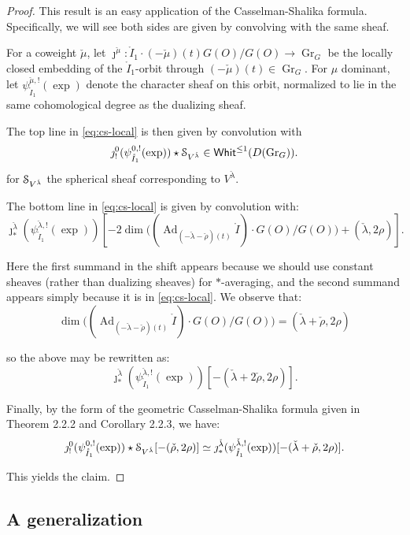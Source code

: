 \documentclass[reqno,11pt]{amsart}
\numberwithin{equation}{subsection}
\theoremstyle{remark}
\newcommand{\sS}{{\EuScript S}}
\newcommand{\on}{\operatorname}
\newcommand{\Ad}{\on{Ad}}
\newcommand{\Gr}{\on{Gr}}
\newcommand{\Whit}{\mathsf{Whit}}
\renewcommand{\o}[1]{\mathring{#1}}
\begin{document}
\begin{proof}

This result is an easy application of the Casselman-Shalika formula.
Specifically, we will see both sides are given by convolving with the
same sheaf. 

For a coweight $\check{\mu}$, 
let $\jmath^{\check{\mu}}: \o{I}_1\cdot (-\check{\mu})(t) G(O)/G(O) \to \Gr_G$
be the locally closed embedding of the $\o{I}_1$-orbit through 
$(-\check{\mu})(t) \in \Gr_G$.
For $\mu$ dominant, let $\psi_{\o{I}_1}^{\check{\mu},!}(\exp)$ denote the 
character sheaf on this orbit, normalized to lie in the same cohomological
degree as the dualizing sheaf. 

The top line in \eqref{eq:cs-local} is then given by convolution with 
%
\[
\jmath_!^0(\psi_{\o{I}_1}^{0,!}(\exp))  \star \sS_{V^{\check{\lambda}}} \in 
\Whit^{\leq 1}(D(\Gr_G)).
\]
\noindent for $\sS_{V^{\check{\lambda}}}$ the spherical sheaf corresponding
to $V^{\check{\lambda}}$.

The bottom line in \eqref{eq:cs-local} is given by convolution 
with: 
%
\[
\jmath_*^{\check{\lambda}}(\psi_{\o{I}_1}^{\check{\lambda},!}(\exp))
[-2\dim \big((\Ad_{(-\check{\lambda}-\check{\rho})(t)} \o{I})\cdot G(O)/G(O)\big)
+(\check{\lambda},2\rho)].
\]

\noindent Here the first summand in the shift appears because we should use constant
sheaves (rather than dualizing sheaves) for $*$-averaging, and the
second summand appears simply because it is in \eqref{eq:cs-local}.
We observe that:
%
\[
\dim \big((\Ad_{(-\check{\lambda}-\check{\rho})(t)}\o{I}) \cdot G(O)/G(O)\big) = 
(\check{\lambda}+\check{\rho},2\rho)
\]

\noindent so the above may be rewritten as:
%
\[
\jmath_*^{\check{\lambda}}(\psi_{\o{I}_1}^{\check{\lambda},!}(\exp))
[-(\check{\lambda}+2\check{\rho},2\rho)].
\]

Finally, by the form of the geometric Casselman-Shalika formula 
given in \cite{abbgm} Theorem 2.2.2 and Corollary 2.2.3, we have:
%
\[
\jmath_!^0(\psi_{\o{I}_1}^{0,!}(\exp))  \star \sS_{V^{\check{\lambda}}}
[-(\check{\rho},2\rho)] \simeq 
\jmath_*^{\check{\lambda}}(\psi_{\o{I}_1}^{\check{\lambda},!}(\exp))
[-(\check{\lambda}+\check{\rho},2\rho)].
\]

\noindent This yields the claim. 

\end{proof}

\subsection{A generalization}
\end{document}
